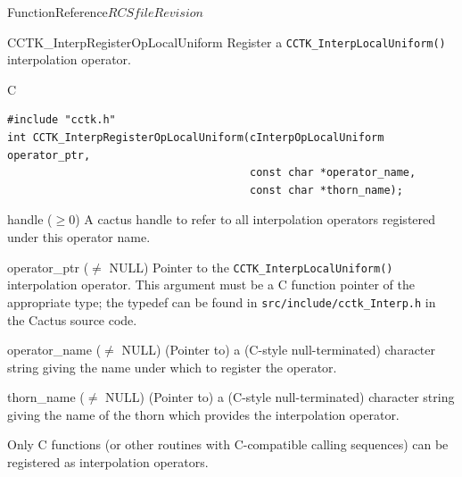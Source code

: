 \begin{cactuspart}{FunctionReference}{$RCSfile$}{$Revision$}

\begin{FunctionDescription}{CCTK\_InterpRegisterOpLocalUniform}
\label{CCTK-InterpRegisterOpLocalUniform}
Register a \verb|CCTK_InterpLocalUniform()| interpolation operator.

\begin{SynopsisSection}
\begin{Synopsis}{C}
\begin{verbatim}
#include "cctk.h"
int CCTK_InterpRegisterOpLocalUniform(cInterpOpLocalUniform operator_ptr,
                                      const char *operator_name,
                                      const char *thorn_name);
\end{verbatim}
\end{Synopsis}
\end{SynopsisSection}

\begin{ResultSection}
\begin{Result}{handle ($\ge 0$)}
A cactus handle to refer to all interpolation operators registered
under this operator name.
\end{Result}
\end{ResultSection}

\begin{ParameterSection}
\begin{Parameter}{operator\_ptr ($\ne$ NULL)}
\hbox{}
Pointer to the \verb|CCTK_InterpLocalUniform()| interpolation operator.
This argument must be a C function pointer of the appropriate type;
the typedef can be found in \verb|src/include/cctk_Interp.h| in the
Cactus source code.
\end{Parameter}
\begin{Parameter}{operator\_name ($\ne$ NULL)}
\hbox{}
(Pointer to) a (C-style null-terminated) character string giving
the name under which to register the operator.
\end{Parameter}
\begin{Parameter}{thorn\_name ($\ne$ NULL)}
\hbox{}
(Pointer to) a (C-style null-terminated) character string giving
the name of the thorn which provides the interpolation operator.
\end{Parameter}
\end{ParameterSection}

\begin{Discussion}
Only C functions (or other routines with C-compatible calling sequences)
can be registered as interpolation operators.
\end{Discussion}


\end{FunctionDescription}
\end{cactuspart}
